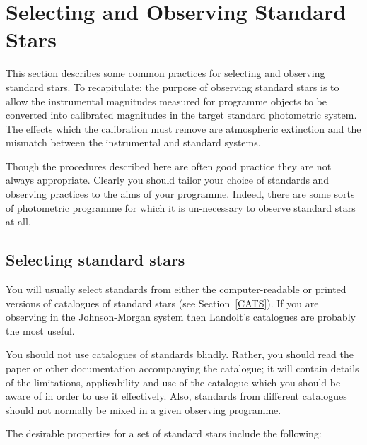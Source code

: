 \documentclass[twoside,11pt]{article}
\newcommand{\xlabel}[1]{}
\begin{document}
\section{\xlabel{SELOBS_STANDARD}\label{SELOBS_STANDARD}Selecting and
Observing Standard Stars}

This section describes some common practices for selecting and observing
standard stars.  To recapitulate: the purpose of observing standard stars
is to allow the instrumental magnitudes measured for programme objects to
be converted into calibrated magnitudes in the target standard photometric
system.  The effects which the calibration must remove are atmospheric
extinction and the mismatch between the instrumental and standard systems.

Though the procedures described here are often good practice they are
not always appropriate.  Clearly you should tailor your choice of
standards and observing practices to the aims of your programme.
Indeed, there are some sorts of photometric programme for which it is
un-necessary to observe standard stars at all.

\subsection{\label{SEL_STANDARD}Selecting standard stars}

You will usually select standards from either the computer-readable or
printed versions of catalogues of standard stars (see
Section~\ref{CATS}).  If you are observing in the Johnson-Morgan system
then Landolt's catalogues are probably the most useful.

You should not use catalogues of standards blindly.  Rather, you should
read the paper or other documentation accompanying the catalogue; it
will contain details of the limitations, applicability and use of the
catalogue which you should be aware of in order to use it effectively.
Also, standards from different catalogues should not normally be mixed
in a given observing programme.

The desirable properties for a set of standard stars include the
following:
\end{document}
